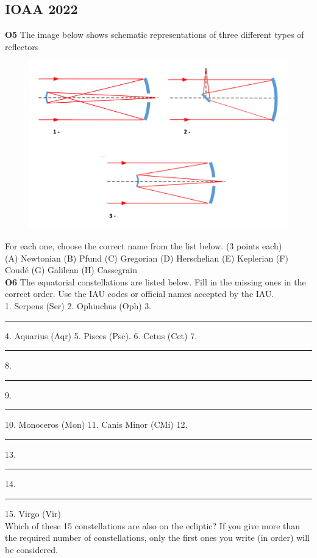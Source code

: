 \documentclass[a4paper,12pt]{extarticle}
\begin{document}
\subsection{IOAA 2022}
\textbf{O5} The image below shows schematic representations of three different types of reflectors
\begin{figure}[H]
	\centering
	\includegraphics[width=0.7\linewidth]{ioaa22_1.png}
\end{figure}
For each one, choose the correct name from the list below. \hfill(3 points each)\\
(A) Newtonian (B) Pfund (C) Gregorian (D) Herschelian (E) Keplerian (F) Coudé (G) Galilean (H) Cassegrain\\

\textbf{O6} The equatorial constellations are listed below. Fill in the missing ones in the correct order. Use the IAU codes or official names accepted by the IAU.\\

1. Serpens (Ser) 2. Ophiuchus (Oph) 3. \rule{1cm}{0.15mm} 4. Aquarius (Aqr) 5. Pisces (Psc).     6. Cetus  (Cet) 7.\rule{1cm}{0.15mm}   8. \rule{1cm}{0.15mm} 9. \rule{1cm}{0.15mm} 10. Monoceros (Mon) 11. Canis Minor (CMi) 12. \rule{1cm}{0.15mm} 13. \rule{1cm}{0.15mm} 14. \rule{1cm}{0.15mm} 15. Virgo (Vir)\\

Which of these 15 constellations are also on the ecliptic? If you give more than the required number of constellations, only the first ones you write (in order) will be considered.\\
\end{document}
